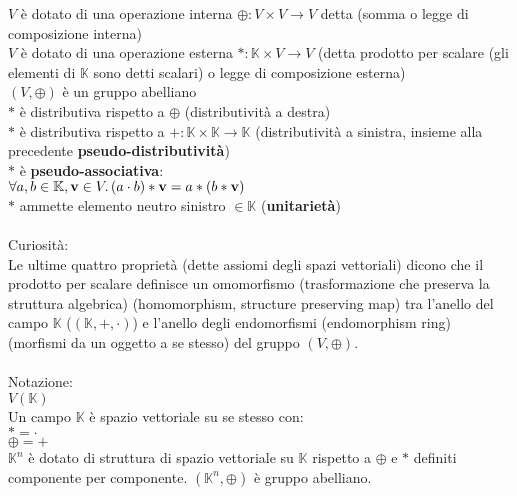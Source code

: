 \documentclass[a4paper, twoside, italian, 11pt]{book}
\newcommand{\K}{\mathbb{K}}
\begin{document}
\noindent
$V$ è dotato di una operazione interna $\oplus : V \times V \rightarrow V$ detta (somma o legge di composizione interna) \\

\noindent
$V$ è dotato di una operazione esterna $* : \K \times V \rightarrow V$ (detta prodotto per scalare (gli elementi di $\K$ sono detti scalari) o legge di composizione esterna) \\

\noindent
$(V, \oplus)$ è un gruppo abelliano \\

\noindent
$*$ è distributiva rispetto a $\oplus$ (distributività a destra) \\

\noindent
$*$ è distributiva rispetto a $+ : \K \times \K \rightarrow \K$ (distributività a sinistra, insieme alla precedente \textbf{pseudo-distributività}) \\

\noindent
$*$ è \textbf{pseudo-associativa}: \\
\indent
$\forall a, b \in \K, \textbf{v} \in V \ldotp (a \cdot b) * \textbf{v} = a * (b * \textbf{v})$ \\

\noindent
$*$ ammette elemento neutro sinistro $\in \K$ (\textbf{unitarietà}) \\\\

\noindent
Curiosità: \\
Le ultime quattro proprietà (dette assiomi degli spazi vettoriali) dicono che il prodotto per scalare definisce un omomorfismo (trasformazione che preserva la struttura algebrica) (homomorphism, structure preserving map) tra l'anello del campo $\K$ ($(\K, +, \cdot)$) e l'anello degli endomorfismi (endomorphism ring) (morfismi da un oggetto a se stesso) del gruppo $(V, \oplus)$. \\\\

\noindent
Notazione: \\
\indent
$V(\K)$ \\

\noindent
Un campo $\K$ è spazio vettoriale su se stesso con: \\
\indent
$* = \cdot$ \\
\indent
$\oplus = +$\\

\noindent
$\K^n$ è dotato di struttura di spazio vettoriale su $\K$ rispetto a $\oplus$ e $*$ definiti componente per componente. $(\K^n, \oplus)$ è gruppo abelliano. \\
\end{document}
